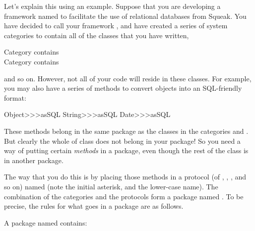\documentclass[a4paper,10pt,twoside]{book}
\begin{document}
Let's explain this using an example.
Suppose that you are developing a framework named to facilitate the use of relational databases from Squeak. You have decided to call your framework , and have created a series of system categories to contain all of the classes that you have written, \eg

\vspace{1ex}
\noindent
Category  contains \\
Category  contains 

\vspace{1ex}
\noindent
and so on. However, not all of your code will reside in these classes. For example, you may also have a series of methods to convert objects into an SQL-friendly format:

\begin{code}{}
Object>>>asSQL
String>>>asSQL
Date>>>asSQL
\end{code}

\noindent
These methods belong in  the same package as the classes in the 
categories  and . 
But clearly the whole of class  does not belong in your package! 
So you need a way of putting certain \emph{methods} in a package, even though the rest of the class is in another package.

The way that you do this is by placing those methods in a protocol (of , , , and so on) named  (note the initial asterisk, and the lower-case name). The combination of the  categories and the  protocols form a package named .
To be precise, the rules for what goes in a package are as follows.

A package named  contains:
\end{document}
